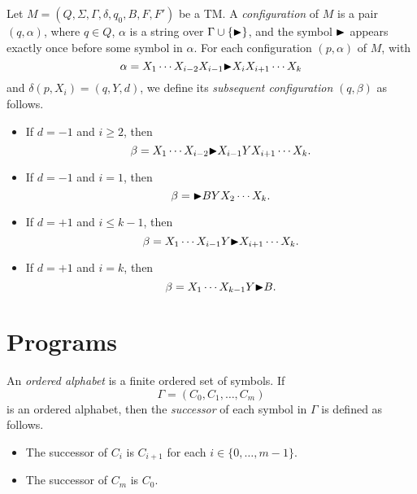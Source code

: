 \begin{definition}
  Let $M = (Q, \Sigma, \Gamma, \delta, q_0, B, F, F')$ be a TM.
  A \emph{configuration} of $M$ is a pair $(q, \alpha)$, where
  $q \in Q$, $\alpha$ is a string over $\Gamma \cup \{\mathord{\blacktriangleright}\}$, and the
  symbol $\mathord{\blacktriangleright}$ appears exactly once before some symbol in $\alpha$.
  For each configuration $(p, \alpha)$ of $M$, with
  \begin{equation*}
    \alpha = X_1 \cdots X_{i-2}X_{i-1} \mathord{\blacktriangleright} X_iX_{i+1} \cdots X_k
  \end{equation*}
  and $\delta(p, X_i) = (q, Y, d)$, we define its
  \emph{subsequent configuration} $(q, \beta)$ as follows.
  \begin{itemize}
    \item If $d = -1$ and $i \geq 2$, then
    \begin{equation*}
      \beta = X_1 \cdots X_{i-2} \mathord{\blacktriangleright} X_{i-1}YX_{i+1} \cdots X_k.
    \end{equation*}
    \item If $d = -1$ and $i = 1$, then
    \begin{equation*}
      \beta = \mathord{\blacktriangleright} BYX_2 \cdots X_k.
    \end{equation*}
    \item If $d = +1$ and $i \leq k - 1$, then
    \begin{equation*}
      \beta = X_1 \cdots X_{i-1}Y \mathord{\blacktriangleright} X_{i+1} \cdots X_k.
    \end{equation*}
    \item If $d = +1$ and $i = k$, then
    \begin{equation*}
      \beta = X_1 \cdots X_{k-1}Y \mathord{\blacktriangleright} B.
    \end{equation*}
  \end{itemize}
\end{definition}

\section{Programs}
\begin{definition}
  An \emph{ordered alphabet} is a finite ordered set of symbols.
  If
  \begin{equation*}
    \Gamma = (C_0, C_1, \dots, C_m)
  \end{equation*}
  is an ordered alphabet, then the \emph{successor} of each symbol in $\Gamma$
  is defined as follows.
  \begin{itemize}
    \item The successor of $C_i$ is $C_{i+1}$ for each
    $i \in \{0, \dots, m-1\}$.
    \item The successor of $C_m$ is $C_0$.
  \end{itemize}
\end{definition}

